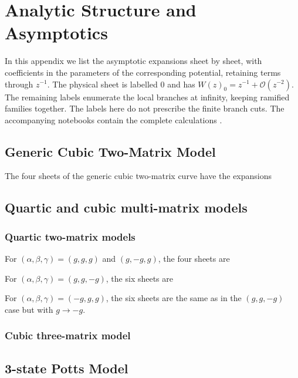 \appendix
\section{Analytic Structure and Asymptotics}
\label{app:asympt}

In this appendix we list the asymptotic expansions sheet by sheet, with coefficients in the
parameters of the corresponding potential, retaining terms through $z^{-1}$. The physical sheet is
labelled $0$ and has $W(z)_0=z^{-1}+\mathcal O(z^{-2})$. The remaining labels enumerate the local
branches at infinity, keeping ramified families together. The labels here do not prescribe the finite branch cuts. The
accompanying notebooks contain the complete calculations \cite{Kulanthaivelu:LoopEquationsCode}.

\subsection{Generic Cubic Two-Matrix Model}
The four sheets of the generic cubic two-matrix curve have the expansions


\subsection{Quartic and cubic multi-matrix models}

\subsubsection{Quartic two-matrix models}
For $(\alpha,\beta,\gamma)=(g,g,g)$ and $(g,-g,g)$, the four sheets are

\noindent For $(\alpha,\beta,\gamma)=(g,g,-g)$, the six sheets are

\noindent For $(\alpha,\beta,\gamma)=(-g,g,g)$, the six sheets are the same as in the $(g,g,-g)$ case but with $g\rightarrow -g$.

\subsubsection{Cubic three-matrix model}


\subsection{3-state Potts Model}


